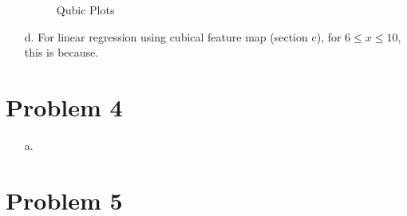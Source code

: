 \documentclass[twoside]{homework}
\begin{document}
\begin{itemize}
\begin{figure}[H]
            \caption{Qubic Plots}
            \label{fig:cubic_plots}
        \end{figure}
    \item[d.] For linear regression using cubical feature map (section c), for $6\leq{x}\leq{10}$, this is because.
\end{itemize}
\newpage

\section*{Problem 4}
\begin{itemize}
    \item[a.]
\end{itemize}
\newpage

\section*{Problem 5}
\end{document}
